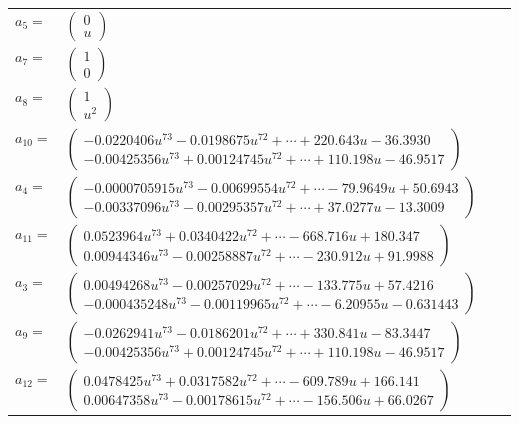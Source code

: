 \documentclass[1p]{elsarticle_modified}
\theoremstyle{definition}
\begin{document}
\begin{tabular}{m{7pt} m{180pt} m{7pt} m{180pt} }
\flushright $a_{5}=$&$\begin{pmatrix}0\\u\end{pmatrix}$ \\
\flushright $a_{7}=$&$\begin{pmatrix}1\\0\end{pmatrix}$ \\
\flushright $a_{8}=$&$\begin{pmatrix}1\\u^2\end{pmatrix}$ \\
\flushright $a_{10}=$&$\begin{pmatrix}-0.0220406 u^{73}-0.0198675 u^{72}+\cdots+220.643 u-36.3930\\-0.00425356 u^{73}+0.00124745 u^{72}+\cdots+110.198 u-46.9517\end{pmatrix}$ \\
\flushright $a_{4}=$&$\begin{pmatrix}-0.0000705915 u^{73}-0.00699554 u^{72}+\cdots-79.9649 u+50.6943\\-0.00337096 u^{73}-0.00295357 u^{72}+\cdots+37.0277 u-13.3009\end{pmatrix}$ \\
\flushright $a_{11}=$&$\begin{pmatrix}0.0523964 u^{73}+0.0340422 u^{72}+\cdots-668.716 u+180.347\\0.00944346 u^{73}-0.00258887 u^{72}+\cdots-230.912 u+91.9988\end{pmatrix}$ \\
\flushright $a_{3}=$&$\begin{pmatrix}0.00494268 u^{73}-0.00257029 u^{72}+\cdots-133.775 u+57.4216\\-0.000435248 u^{73}-0.00119965 u^{72}+\cdots-6.20955 u-0.631443\end{pmatrix}$ \\
\flushright $a_{9}=$&$\begin{pmatrix}-0.0262941 u^{73}-0.0186201 u^{72}+\cdots+330.841 u-83.3447\\-0.00425356 u^{73}+0.00124745 u^{72}+\cdots+110.198 u-46.9517\end{pmatrix}$ \\
\flushright $a_{12}=$&$\begin{pmatrix}0.0478425 u^{73}+0.0317582 u^{72}+\cdots-609.789 u+166.141\\0.00647358 u^{73}-0.00178615 u^{72}+\cdots-156.506 u+66.0267\end{pmatrix}$ \\

\end{tabular}
\end{document}
